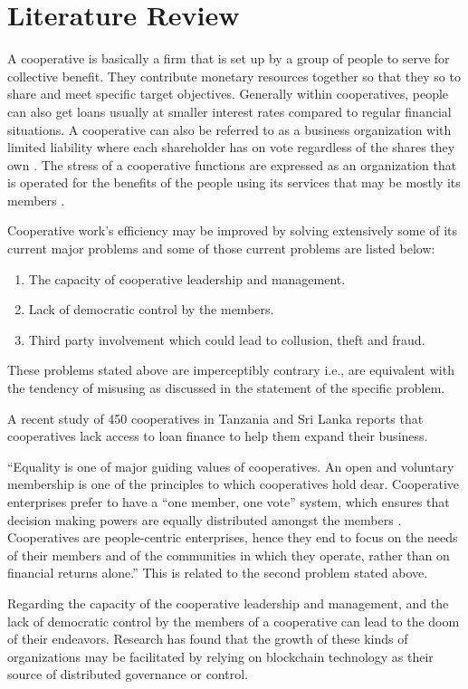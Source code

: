 \documentclass{article}
\begin{document}
\section{Literature Review}
A cooperative is basically a firm that is set up by a group of people to serve for collective benefit. They contribute monetary resources together so that they so to share and meet specific target objectives. Generally within cooperatives, people can also get loans usually at smaller interest rates compared to regular financial situations. A cooperative can also be referred to as a business organization with limited liability where each shareholder has on vote regardless of the shares they own \cite{credo22393191}. The stress of a cooperative functions are expressed as an organization that is operated for the benefits of the people using its services that may be mostly its members \cite{credo17700186}.

Cooperative work's efficiency may be improved by solving extensively some of its current major problems and some of those current problems are listed below:
\begin{enumerate}
    \item The capacity of cooperative leadership and management.
    \item Lack of democratic control by the members.
    \item Third party involvement which could lead to collusion, theft and fraud.
\end{enumerate} 

These problems stated above are imperceptibly contrary i.e., are equivalent with the tendency of misusing as discussed in the statement of the specific problem. 

A recent study of 450 cooperatives in Tanzania and Sri Lanka reports that cooperatives lack access to loan finance to help them expand their business. 
 
“Equality is one of major guiding values of cooperatives. An open and voluntary membership is one of the principles to which cooperatives hold dear. Cooperative enterprises prefer to have a “one member, one vote” system, which ensures that decision making powers are equally distributed amongst the members . Cooperatives are people-centric enterprises, hence they end to focus on the needs of their members and of the communities in which they operate, rather than on financial returns alone.” \cite{un_issues} This is related to the second problem stated above.

Regarding the capacity of the cooperative leadership and management, and the lack of democratic control by the members of a cooperative can lead to the doom of their endeavors. Research has found that the growth of these kinds of organizations may be facilitated by relying on blockchain technology as their source of distributed governance or control. \cite{mannan2018fostering}
\end{document}
